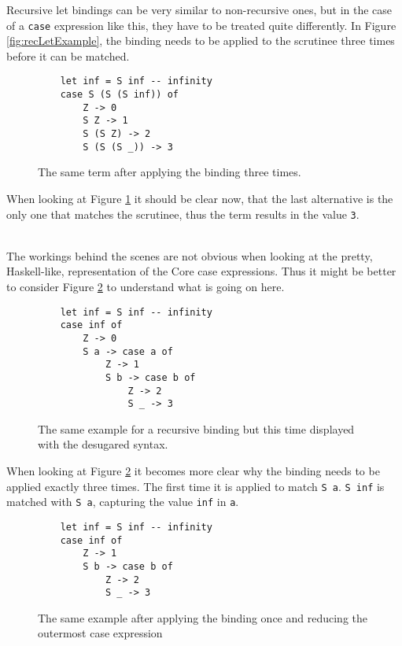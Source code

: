 Recursive let bindings can be very similar to non-recursive ones,
but in the case of a \texttt{case} expression like this,
they have to be treated quite differently.
In Figure \ref*{fig:recLetExample},
the binding needs to be applied to the scrutinee three times before it can be matched.

\begin{figure}[!ht]
\begin{verbatim}
    let inf = S inf -- infinity
    case S (S (S inf)) of
        Z -> 0
        S Z -> 1
        S (S Z) -> 2
        S (S (S _)) -> 3
\end{verbatim}
    \caption{The same term after applying the binding three times.}
    \label{fig:recLetExampleApplied}
\end{figure}

When looking at Figure \ref*{fig:recLetExampleApplied} it should be clear now,
that the last alternative is the only one that matches the scrutinee,
thus the term results in the value \texttt{3}.

\ \\
The workings behind the scenes are not obvious when looking at the pretty, Haskell-like, representation of the Core case expressions.
Thus it might be better to consider Figure \ref*{fig:recLetExampleDesugared} to understand what is going on here.

\begin{figure}[!ht]
\begin{verbatim}
    let inf = S inf -- infinity
    case inf of
        Z -> 0
        S a -> case a of
            Z -> 1
            S b -> case b of
                Z -> 2
                S _ -> 3
\end{verbatim}
    \caption{The same example for a recursive binding but this time displayed with the desugared syntax.}
    \label{fig:recLetExampleDesugared}
\end{figure}

When looking at Figure \ref*{fig:recLetExampleDesugared} it becomes more clear why the binding needs to be applied exactly three times.
The first time it is applied to match \texttt{S a}.
\texttt{S inf} is matched with \texttt{S a},
capturing the value \texttt{inf} in \texttt{a}.

\begin{figure}[!ht]
\begin{verbatim}
    let inf = S inf -- infinity
    case inf of
        Z -> 1
        S b -> case b of
            Z -> 2
            S _ -> 3
\end{verbatim}
    \caption{The same example after applying the binding once and reducing the outermost case expression}
    \label{fig:recLetExampleDesugared1}
\end{figure}

